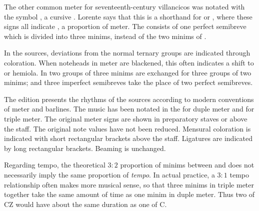 The other common meter for seventeenth-century villancicos was notated with the 
symbol \meterCZorig{}, a cursive \meterCZ{}.
Lorente says that this is a shorthand for \meterCThreeTwo{} or \meterCThree{},
where these signs all indicate , a 
proportion of \meterC{} meter.%
  \autocite[165]{Lorente:Porque}
The  consists of one perfect semibreve which is divided into three 
minims, instead of the two minims of \meterC{}.

In the sources, deviations from the normal ternary groups are indicated through 
coloration. 
When noteheads in \meterCThree{} meter are blackened, this often indicates a
shift to  or hemiola.
In  two groups of three minims are exchanged for three 
groups of two minims; and three imperfect semibreves take the place of two
perfect semibreves.

The edition presents the rhythms of the sources according to modern conventions 
of meter and barlines.
The music has been notated in the \meterC{} for duple meter and \meterCThree{}
for triple meter.
The original meter signs are shown in preparatory staves or above the staff.
The original note values have not been reduced.
Mensural coloration is indicated with short rectangular brackets above the 
staff.
Ligatures are indicated by long rectangular brackets.
Beaming is unchanged.

Regarding tempo, the theoretical $3:2$ proportion of minims between
\meterCThreeTwo{} and \meterC{} does not necessarily imply the same proportion of
\emph{tempo}.  
In actual practice, a $3:1$ tempo relationship often makes more musical sense,
so that three minims in triple meter together take the same amount of time as
one minim in duple meter.
Thus two  of CZ would have about the same duration as one 
 of C.


